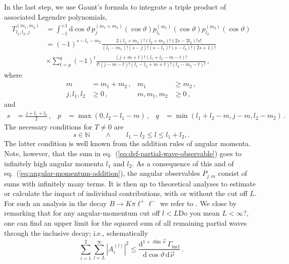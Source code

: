 \documentclass[aps,prd,reprint,nofootinbib,preprintnumbers]{revtex4}
\newcommand{\refeq}[1]{eq.~(\ref{eq:#1})}
\newcommand{\rmdx}[1]{\mbox{d} #1 \,} %
\renewcommand{\theta}{\vartheta}
\newcommand{\fred}[1]{{\color{brown!85!black}#1}}
\begin{document}
In the last step, we use Gaunt's formula \cite{Gaunt:1929} to integrate a triple product of associated Legendre polynomials,
\begin{equation}
\begin{aligned}
    T_{l_1,l_2,j}^{(m_1,m_2)}
        & = \int_{-1}^{+1} \rmdx{\cos\theta} p_{j}^{(m_1 + m_2)}(\cos\theta) p_{l_1}^{(m_1)}(\cos\theta) p_{l_2}^{(m_2)}(\cos\theta)\\
        & = (-1)^{s - l_1 - m_2} \frac{2 (l_1 + m_1)! (l_2 + m_2)! (2s - 2 l_2)! s!}{(l_1 - m_1)! (s - j)! (s - l_1)! (s - l_2)! (2s + 1)!}\\
        & \times \sum_{t=p}^q (-1)^t \frac{(j + m + t)!(l_1 + l_2 - m - t)!}{t! (j - m - t)! (l_1 - l_2 + m + t)! (l_2 - m_2 - t)!}\,,
\end{aligned}
\end{equation}
where
\begin{equation}
\begin{aligned}
    m & = m_1 + m_2\,, &
    m_1 & \geq m_2\,,  \\
    j, l_1, l_2 & \geq 0\,, &
    m, m_1, m_2 & \geq 0\,,
\end{aligned}
\end{equation}
and
\begin{equation}
\begin{aligned}
    s & = \frac{j + l_1 + l_2}{2}\,, &
    p & = \max(0, l_2 - l_1 - m)\,, &
    q & = \min(l_1 + l_2 - m, j - m, l_2 - m_2)\,.
\end{aligned}
\end{equation}
The necessary conditions for $T \neq 0$ are
\begin{equation}
    \label{eq:angular-momentum-addition}
    s \in \mathbb{N}\qquad \wedge \qquad l_1 - l_2 \leq l \leq l_1 + l_2,.
\end{equation}
The latter condition is well known from the addition rules of angular momenta. Note, however, that
the sum in \refeq{def-partial-wave-observable} goes to infinitely high angular momenta $l_1$ and $l_2$. As a consequence
of this and of \refeq{angular-momentum-addition}, the angular observables $P_{j,m}$
consist of sums with infinitely many terms. It is then up to theoretical analyses to
estimate or calculate the impact of individual contributions, with or without the cut off $L$.
For such an analysis in the decay $B\to K\pi\ell^+\ell^-$ we refer to \cite{Das:2014sra}.
We close by remarking that for any angular-momentum cut off $l < L$\fred{Do you mean $L < \infty$?}, one can find an upper limit for the squared sum
of all remaining partial waves through the inclusive decay; i.e., schematically
\begin{equation}
    \sum_{i=1}^2 \sum_{l=L}^\infty |A_i^{(l)}|^2 \leq \frac{\rmdx{^{1 + \dim\vec\nu}} \Gamma_\text{incl}}{\rmdx{\cos\theta} \rmdx{\vec\nu}}\,.
\end{equation}



\end{document}
